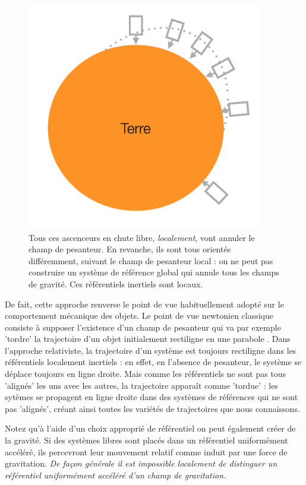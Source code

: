 \begin{figure}[htbp]
	\centering
		\includegraphics[height=10cm]{figs/ascradial.png}
	\caption[Réferentiels localement inertiels]{Tous ces ascenceurs en chute libre, \textit{localement}, vont annuler le champ de pesanteur. En revanche, ils sont tous orientés différemment, suivant le champ de pesanteur local : on ne peut pas construire un système de référence global qui annule tous les champs de gravité. Ces référentiels inertiels sont locaux.}
	\label{f:ascradial}
\end{figure}

De fait, cette approche renverse le point de vue habituellement adopté sur le comportement mécanique des objets. Le point de vue newtonien classique consiste à supposer l'existence d'un champ de pesanteur qui va par exemple 'tordre' la trajectoire d'un objet initialement rectiligne en une parabole . Dans l'approche relativiste, la trajectoire d'un système est toujours rectiligne dans les référentiels localement inertiels : en effet, en l'absence de pesanteur, le système se déplace toujours en ligne droite. Mais comme les référentiels ne sont pas tous 'alignés' les uns avec les autres, la trajectoire apparaît comme 'tordue' : les sytèmes se propagent en ligne droite dans des systèmes de références qui ne sont pas 'alignés', créant ainsi toutes les variétés de trajectoires que nous connaissons. 


Notez qu'à l'aide d'un choix approprié de référentiel on peut également créer de la gravité. Si des systèmes libres sont placés dans un référentiel uniformément accéléré, ils percevront leur mouvement relatif comme induit par une force de gravitation. \textit{De façon générale il est impossible localement de distinguer un référentiel uniformément accéléré d'un champ de gravitation.}


